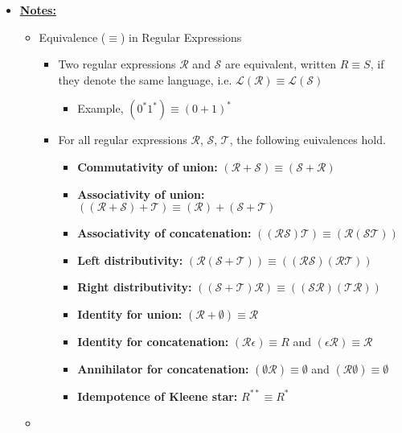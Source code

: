 \documentclass[12pt]{article}
\begin{document}
\begin{itemize}
\item

\bigskip

\underline{\textbf{Notes:}}

\bigskip

\begin{itemize}
    \item Equivalence ($\equiv$) in Regular Expressions
    \begin{itemize}
        \item Two regular expressions $\mathcal{R}$ and $\mathcal{S}$ are
        equivalent, written $R \equiv S$, if they denote the same language,
        i.e. $\mathcal{L}(\mathcal{R}) \equiv \mathcal{L}(\mathcal{S})$

        \begin{itemize}
            \item Example, $(0^*1^*) \equiv (0 + 1)^*$
        \end{itemize}

        \item For all regular expressions $\mathcal{R}$, $\mathcal{S}$, $\mathcal{T}$,
        the following euivalences hold.

        \begin{itemize}
            \item \textbf{Commutativity of union:} $(\mathcal{R} + \mathcal{S}) \equiv (\mathcal{S} + \mathcal{R})$
            \item \textbf{Associativity of union:} $((\mathcal{R} + \mathcal{S}) + \mathcal{T}) \equiv (\mathcal{R})+ (\mathcal{S} + \mathcal{T})$
            \item \textbf{Associativity of concatenation:} $((\mathcal{R}\mathcal{S})\mathcal{T}) \equiv (\mathcal{R}(\mathcal{S}\mathcal{T}))$
            \item \textbf{Left distributivity:} $(\mathcal{R}(\mathcal{S} + \mathcal{T})) \equiv ((\mathcal{R}\mathcal{S})(\mathcal{R}\mathcal{T}))$
            \item \textbf{Right distributivity:} $((\mathcal{S} + \mathcal{T})\mathcal{R}) \equiv ((\mathcal{S}\mathcal{R})(\mathcal{T}\mathcal{R}))$
            \item \textbf{Identity for union:} $(\mathcal{R} + \emptyset) \equiv \mathcal{R}$
            \item \textbf{Identity for concatenation:} $(\mathcal{R}\epsilon) \equiv R$ and $(\epsilon \mathcal{R}) \equiv \mathcal{R}$
            \item \textbf{Annihilator for concatenation:} $(\emptyset \mathcal{R}) \equiv \emptyset$ and $(\mathcal{R} \emptyset) \equiv \emptyset$
            \item \textbf{Idempotence of Kleene star:} $R^{**} \equiv R^*$
        \end{itemize}
    \end{itemize}

    \item
\end{itemize}

\end{itemize}
\end{document}
